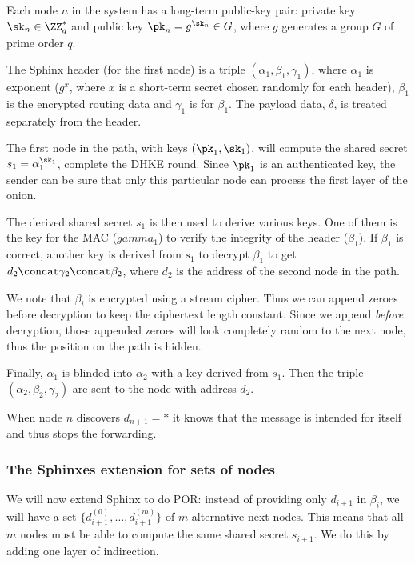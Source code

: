 
Each node \(n\) in the system has a long-term public-key pair: private key 
\(\sk_n\in \ZZ_q^*\) and public key \(\pk_n = g^{\sk_n}\in G\), where \(g\) 
generates a group \(G\) of prime order \(q\).

The Sphinx header (for the first node) is a triple \((\alpha_1, \beta_1, 
  \gamma_1)\), where \(\alpha_1\) is  exponent (\(g^x\), where \(x\) 
is a short-term secret chosen randomly for each header), \(\beta_1\) is the 
encrypted routing data and \(\gamma_1\) is  for \(\beta_1\).
The payload data, \(\delta\), is treated separately from the header.

The first node in the path, with keys \((\pk_1, \sk_1)\), will compute the 
shared secret \(s_1 = \alpha_1^{\sk_1}\), \ie complete the \ac{DHKE} round.
Since \(\pk_1\) is an authenticated key, the sender can be sure that only this 
particular node can process the first layer of the onion.

The derived shared secret \(s_1\) is then used to derive various keys.
One of them is the key for the \ac{MAC} (\(gamma_1\)) to verify the integrity 
of the header (\(\beta_1\)).
If \(\beta_1\) is correct, another key is derived from \(s_1\) to decrypt 
\(\beta_1\) to get \(d_2\concat \gamma_2\concat \beta_2\), where \(d_2\) is the 
address of the second node in the path.

We note that \(\beta_i\) is encrypted using a stream cipher.
Thus we can append zeroes before decryption to keep the ciphertext length 
constant.
Since we append \emph{before} decryption, those appended zeroes will look 
completely random to the next node, thus the position on the path is hidden.

Finally, \(\alpha_1\) is blinded into \(\alpha_2\) with a key derived from 
\(s_1\).
Then the triple \((\alpha_2, \beta_2, \gamma_2)\) are sent to the node with 
address \(d_2\).

When node \(n\) discovers \(d_{n+1} = *\) it knows that the message is intended 
for itself and thus stops the forwarding.

\subsubsection{The Sphinxes extension for sets of nodes}


We will now extend Sphinx to do \ac{POR}: instead of providing only \(d_{i+1}\) 
in \(\beta_i\), we will have a set \(\{d_{i+1}^{(0)}, \dotsc, d_{i+1}^{(m)}\}\) 
of \(m\) alternative next nodes.
This means that all \(m\) nodes must be able to compute the same shared secret 
\(s_{i+1}\).
We do this by adding one layer of indirection.

